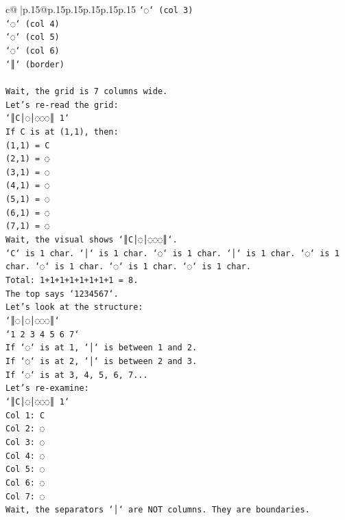 \documentclass{article}
\begin{document}
{\begin{supertabular}{c@{$\;$}|p{.15\linewidth}@{}p{.15\linewidth}p{.15\linewidth}p{.15\linewidth}p{.15\linewidth}p{.15\linewidth}}
{{{\texttt{`◌` (col 3)} \\
\texttt{`◌` (col 4)} \\
\texttt{`◌` (col 5)} \\
\texttt{`◌` (col 6)} \\
\texttt{`║` (border)} \\
\\ 
\texttt{Wait, the grid is 7 columns wide.} \\
\texttt{Let's re{-}read the grid:} \\
\texttt{`║C│◌│◌◌◌║ 1`} \\
\texttt{If C is at (1,1), then:} \\
\texttt{(1,1) = C} \\
\texttt{(2,1) = ◌} \\
\texttt{(3,1) = ◌} \\
\texttt{(4,1) = ◌} \\
\texttt{(5,1) = ◌} \\
\texttt{(6,1) = ◌} \\
\texttt{(7,1) = ◌} \\
\texttt{Wait, the visual shows `║C│◌│◌◌◌║`.} \\
\texttt{`C` is 1 char. `│` is 1 char. `◌` is 1 char. `│` is 1 char. `◌` is 1 char. `◌` is 1 char. `◌` is 1 char. `◌` is 1 char.} \\
\texttt{Total: 1+1+1+1+1+1+1+1 = 8.} \\
\texttt{The top says `1234567`.} \\
\texttt{Let's look at the structure:} \\
\texttt{`║◌│◌│◌◌◌║`} \\
\texttt{`1 2 3 4 5 6 7`} \\
\texttt{If `◌` is at 1, `│` is between 1 and 2.} \\
\texttt{If `◌` is at 2, `│` is between 2 and 3.} \\
\texttt{If `◌` is at 3, 4, 5, 6, 7...} \\
\texttt{Let's re{-}examine:} \\
\texttt{`║C│◌│◌◌◌║ 1`} \\
\texttt{Col 1: C} \\
\texttt{Col 2: ◌} \\
\texttt{Col 3: ◌} \\
\texttt{Col 4: ◌} \\
\texttt{Col 5: ◌} \\
\texttt{Col 6: ◌} \\
\texttt{Col 7: ◌} \\
\texttt{Wait, the separators `│` are NOT columns. They are boundaries.} \\
}}}
\end{supertabular}}
\end{document}
